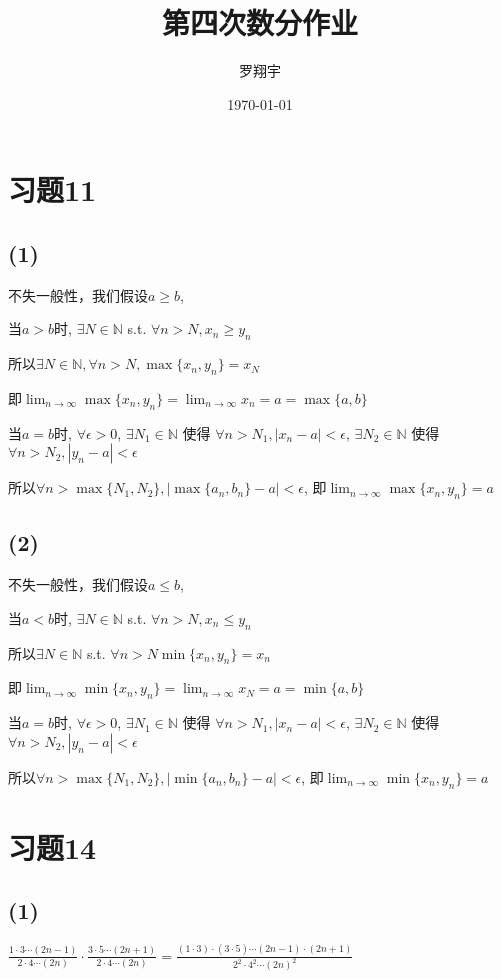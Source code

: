 \documentclass[a4paper,11pt]{article}
\title{第四次数分作业}
\author{罗翔宇}
\date{\today}
\newcommand{\Limit}{\displaystyle \lim_{n \rightarrow \infty}}
\begin{document}
\maketitle
\section*{习题11}
\subsection*{(1)}
不失一般性，我们假设$a \ge b$, 

当$a>b$时, $\exists N \in \mathbb{N}$ s.t. $\forall n > N, x_n \ge y_n$

所以$\exists N \in \mathbb{N} , \forall n > N, \max\{x_n, y_n\} = x_N$

即$\Limit \max\{x_n, y_n\} = \Limit x_n = a = \max\{a, b\}$

当$a=b$时, $\forall \epsilon > 0$, $\exists N_1 \in \mathbb{N}$ 使得 $\forall n > N_1, |x_n - a| < \epsilon$, $\exists N_2 \in \mathbb{N}$ 使得 $\forall n > N_2, |y_n - a| < \epsilon$

所以$\forall n > \max\{N_1, N_2\}, |\max\{a_n, b_n\} - a| < \epsilon$, 即$\Limit \max\{x_n, y_n\} = a$
\subsection*{(2)}
不失一般性，我们假设$a \le b$,

当$a<b$时, $\exists N \in \mathbb{N}$ s.t. $\forall n > N, x_n \le y_n$

所以$\exists N \in \mathbb{N}$ s.t. $\forall n > N \min\{x_n, y_n\} = x_n$

即$\Limit \min\{x_n, y_n\} = \Limit x_N = a = \min\{a, b\}$

当$a=b$时, $\forall \epsilon > 0$, $\exists N_1 \in \mathbb{N}$ 使得 $\forall n > N_1, |x_n - a| < \epsilon$, $\exists N_2 \in \mathbb{N}$ 使得 $\forall n > N_2, |y_n - a| < \epsilon$

所以$\forall n > \max\{N_1, N_2\}, |\min\{a_n, b_n\} - a| < \epsilon$, 即$\Limit \min\{x_n, y_n\} = a$
\section*{习题14}
\subsection*{(1)}
$\frac{1 \cdot 3 \cdots (2n-1)}{2 \cdot 4  \cdots (2n)} \cdot \frac{3 \cdot 5 \cdots (2n+1)}{2 \cdot 4 \cdots (2n)} = \frac{(1\cdot3)\cdot(3\cdot5)\cdots(2n-1)\cdot(2n+1)}{2^2\cdot4^2\cdots(2n)^2}$
\end{document}
